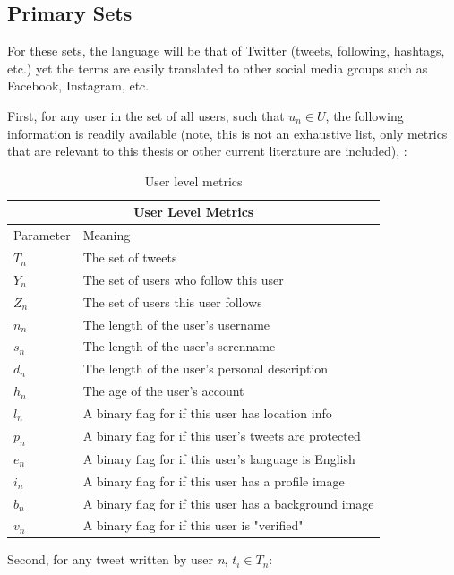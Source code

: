 \documentclass[NETN,manuscript]{stjour-new}
\begin{document}
\subsection{Primary Sets}
\label{Primarysets}
For these sets, the language will be that of Twitter (tweets, following, hashtags, etc.) yet the terms are easily translated to other social media groups such as Facebook, Instagram, etc.

First, for any user in the set of all users, such that $u_n \in U$, the following information is readily available (note, this is not an exhaustive list, only metrics that are relevant to this thesis or other current literature are included), :
\begin{table}[h!]
\centering
\begin{tabular}{ |p{3cm}|p{9cm}|  }
\hline
\multicolumn{2}{|c|}{User Level Metrics} \\
\hline
Parameter & Meaning \\
\hline
$T_n$ & The set of tweets\\
$Y_n$ & The set of users who follow this user \\
$Z_n$ & The set of users this user follows \\
$n_n$ & The length of the user's username \\
$s_n$ & The length of the user's screnname \\
$d_n$ & The length of the user's personal description \\
$h_n$ & The age of the user's account\\
$l_n$ & A binary flag for if this user has location info \\
$p_n$ & A binary flag for if this user's tweets are protected \\
$e_n$ & A binary flag for if this user's language is English \\
$i_n$ & A binary flag for if this user has a profile image \\
$b_n$ & A binary flag for if this user has a background image \\
$v_n$ & A binary flag for if this user is "verified" \\
\hline
\end{tabular}
\caption{User level metrics}
\label{users}
\end{table}


Second, for any tweet written by user \textit{n}, $t_i \in T_n$:
\end{document}
